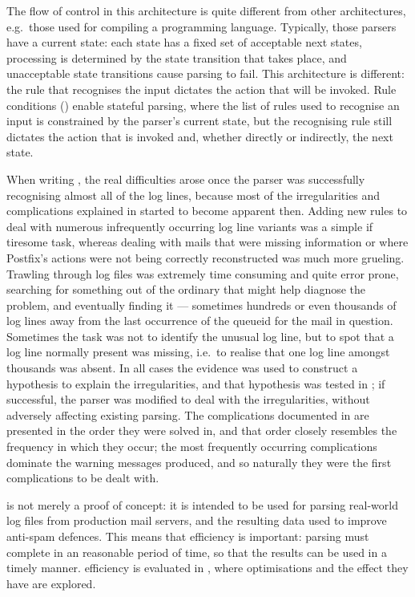 The flow of control in this architecture is quite different from other
architectures, e.g.\ those used for compiling a programming language.
Typically, those parsers have a current state: each state has a fixed set
of acceptable next states, processing is determined by the state transition
that takes place, and unacceptable state transitions cause parsing to fail.
This architecture is different: the rule that recognises the input dictates
the action that will be invoked.  Rule conditions () enable stateful parsing, where the list of
rules used to recognise an input is constrained by the parser's current
state, but the recognising rule still dictates the action that is invoked
and, whether directly or indirectly, the next state.

When writing \parsername{}, the real difficulties arose once the parser was
successfully recognising almost all of the log lines, because most of the
irregularities and complications explained in 
started to become apparent then.  Adding new rules to deal with numerous
infrequently occurring log line variants was a simple if tiresome task,
whereas dealing with mails that were missing information or where Postfix's
actions were not being correctly reconstructed was much more grueling.
Trawling through log files was extremely time consuming and quite error
prone, searching for something out of the ordinary that might help diagnose
the problem, and eventually finding it --- sometimes hundreds or even
thousands of log lines away from the last occurrence of the queueid for the
mail in question.  Sometimes the task was not to identify the unusual log
line, but to spot that a log line normally present was missing, i.e.\ to
realise that one log line amongst thousands was absent.  In all cases the
evidence was used to construct a hypothesis to explain the irregularities,
and that hypothesis was tested in \parsername{}; if successful, the parser
was modified to deal with the irregularities, without adversely affecting
existing parsing.  The complications documented in
 are presented in the order they were solved in,
and that order closely resembles the frequency in which they occur; the
most frequently occurring complications dominate the warning messages
produced, and so naturally they were the first complications to be dealt
with.

\parsername{} is not merely a proof of concept: it is intended to be used
for parsing real-world log files from production mail servers, and the
resulting data used to improve anti-spam defences.  This means that
efficiency is important: parsing must complete in an reasonable period of
time, so that the results can be used in a timely manner.  \parsernames{}
efficiency is evaluated in , where
optimisations and the effect they have are explored.

